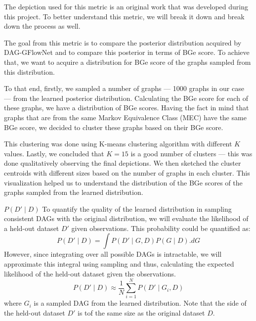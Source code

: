 \documentclass{lxaiproposal}
\begin{document}
    The depiction used for this metric is an original work that was developed during this project. To better
    understand this metric, we will break it down and break down the process as well.

    The goal from this metric is to compare the posterior distribution acquired by DAG-GFlowNet and to compare this
    posterior in terms of BGe score. To achieve that, we want to acquire a distribution for BGe score of the graphs
    sampled from this distribution.

    To that end, firstly, we sampled a number of graphs --- 1000 graphs in our case --- from the learned posterior
    distribution. Calculating the BGe score for each of these graphs, we have a distribution of BGe scores. Having
    the fact in mind that graphs that are from the same Markov Equivalence Class (MEC) have the same BGe score, we
    decided to cluster these graphs based on their BGe score.

    This clustering was done using K-means clustering algorithm with different $K$ values. Lastly, we concluded that
    $K=15$ is a good number of clusters --- this was done qualitatively observing the final depictions. We then
    sketched the cluster centroids with different sizes based on the number of graphs in each cluster. This
    visualization helped us to understand the distribution of the BGe scores of the graphs sampled from the learned
    distribution.

    \vspace*{3mm}
    \textbf{$P(D' \mid D)$} To quantify the quality of the learned distribution in sampling consistent DAGs with the
    original distribution, we will evaluate the likelihood of a held-out dataset $D'$ given observations. This
    probability could be quantified as:
    \begin{equation}
        P(D' \mid D) = \int P(D' \mid G, D) P(G \mid D). dG
        \label{eq:likelihood}
    \end{equation}
    However, since integrating over all possible DAGs is intractable, we will approximate this integral using
    sampling and thus, calculating the expected likelihood of the held-out dataset given the observations.
    \begin{equation}
        P(D' \mid D) \approx \frac{1}{N} \sum_{i=1}^{N} P(D' \mid G_i, D)
        \label{eq:approx_likelihood}
    \end{equation}
    where $G_i$ is a sampled DAG from the learned distribution. Note that the side of the held-out dataset $D'$ is
    tof the same size as the original dataset $D$.
\end{document}
